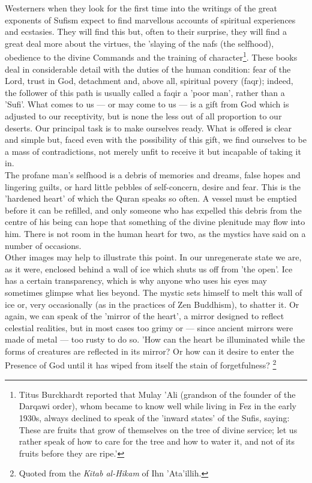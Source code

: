 \documentclass[11pt, b5paper, twoside]{book}
\begin{document}
Westerners when they look for the first time into the writings of the great exponents of Sufism 
expect to find marvellous accounts of spiritual experiences and ecstasies. They will find this but, 
often to their surprise, they will find a great deal more about the virtues, the 'slaying of the nafs 
(the selfhood), obedience to the divine Commands and the training of character\footnote{Titus Burckhardt reported that Mulay 'Ali (grandson of the founder of the Darqawi order), whom 
became to know well while living in Fez in the early 1930s, always declined to speak of the 'inward 
states' of the Sufis, saying: These are fruits that grow of themselves on the tree of divine service; 
let us rather speak of how to care for the tree and how to water it, and not of its fruits before 
they are ripe.' }. These books 
deal in considerable detail with the duties of the human condition: fear of the Lord, trust in God, 
detachment and, above all, spiritual povery (faqr); indeed, the follower of this path is usually 
called a faqir a 'poor man', rather than a 'Sufi'. What comes to us --- or may come to us --- is a gift 
from God which is adjusted to our receptivity, but is none the less out of all proportion to our 
deserts. Our principal task is to make ourselves ready. What is offered is clear and simple but, 
faced even with the possibility of this gift, we find ourselves to be a mass of contradictions, not 
merely unfit to receive it but incapable of taking it in. \\

The profane man's selfhood is a debris of memories and dreams, false hopes and lingering guilts, or 
hard little pebbles of self-concern, desire and fear. This is the 'hardened heart' of which the Quran 
speaks so often. A vessel must be emptied before it can be refilled, and only someone who has 
expelled this debris from the centre of his being can hope that something of the divine plenitude may 
flow into him. There is not room in the human heart for two, as the mystics have said on a number of 
occasions. \\

Other images may help to illustrate this point. In our unregenerate state we are, as it were, 
enclosed behind a wall of ice which shuts us off from 'the open'. Ice has a certain transparency, 
which is why anyone who uses his eyes may sometimes glimpse what lies beyond. The mystic sets himself 
to melt this wall of ice or, very occasionally (as in the practices of Zen Buddhism), to shatter it. 
Or again, we can speak of the 'mirror of the heart', a mirror designed to reflect celestial 
realities, but in most cases too grimy or --- since ancient mirrors were made of metal --- too rusty to 
do so. 'How can the heart be illuminated while the forms of creatures are reflected in its mirror? Or how can it desire to enter the Presence of God until it has wiped from itself the stain of 
forgetfulness? \footnote{Quoted from the \emph{Kitab al-Hikam} of Ihn 'Ata'illih.}
\end{document}
